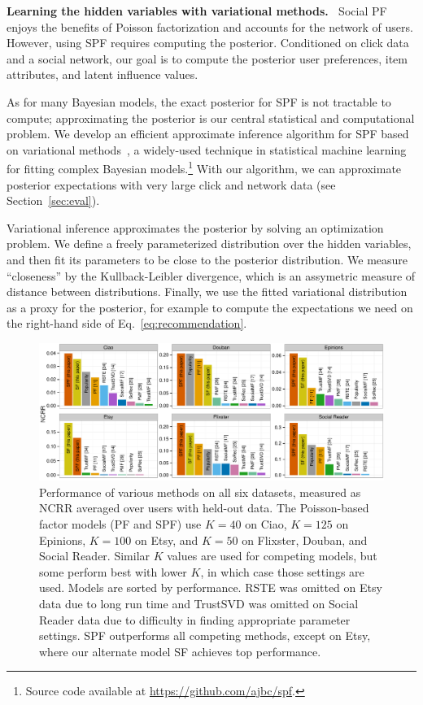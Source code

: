 \documentclass{sig-alternate-2013}
\newcommand{\mypar}[1]{\vspace{0.05in} \noindent \textbf{#1 \,}}
\begin{document}
\mypar{Learning the hidden variables with variational methods.}
Social PF enjoys the benefits of Poisson factorization and accounts
for the network of users.  However, using SPF requires computing
the posterior.  Conditioned on click data and a social
network, our goal is to compute the posterior user preferences, item
attributes, and latent influence values.

As for many Bayesian models, the exact posterior for SPF is not
tractable to compute; approximating the posterior is our central
statistical and computational problem.  We develop an efficient
approximate inference algorithm for SPF based on variational
methods~\cite{Bishop:2006,Jordan:1999}, a widely-used technique in
statistical machine learning for fitting complex Bayesian
models.\footnote{Source code available at \url{https://github.com/ajbc/spf}.}
With our algorithm, we can approximate posterior expectations with
very large click and network data (see Section~\ref{sec:eval}).

Variational inference approximates the posterior by solving an
optimization problem. We define a freely parameterized
distribution over the hidden variables, and then fit its parameters to
be close to the posterior distribution.  We measure ``closeness'' by
the Kullback-Leibler divergence, which is an assymetric measure of
distance between distributions.  Finally, we use the fitted
variational distribution as a proxy for the posterior, for example to
compute the expectations we need on the right-hand side of
Eq.~\ref{eq:recommendation}.

\begin{figure}[t]
\includegraphics[width=\textwidth]{../fig/all.pdf}
\caption{Performance of various methods on all six datasets, measured
  as NCRR averaged over users with held-out data.  The Poisson-based
  factor models (PF and SPF) use $K=40$ on Ciao, $K=125$ on Epinions,
  $K=100$ on Etsy, and $K=50$ on Flixster, Douban, and Social Reader.
  Similar $K$ values are used for competing models, but some perform
  best with lower $K$, in which case those settings are used.  Models
  are sorted by performance.  RSTE was omitted on Etsy data due to
  long run time and TrustSVD was omitted on Social Reader data due to
  difficulty in finding appropriate parameter
  settings.  SPF outperforms all competing methods, except on Etsy,
  where our alternate model SF achieves top performance.}\label{fig:all}
\end{figure}
\end{document}
